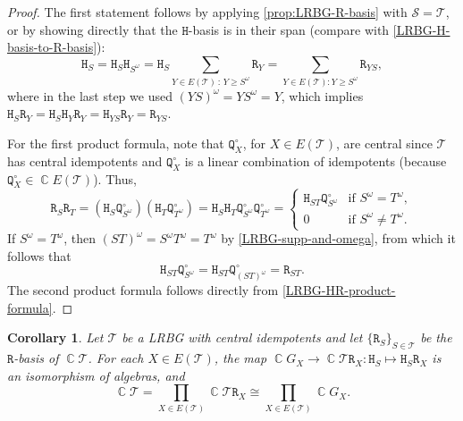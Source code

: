 \documentclass[11pt, oneside, reqno]{amsart}
\newtheorem{cor}[theorem]{Corollary}
\theoremstyle{definition}
\numberwithin{equation}{section}
\DeclareMathOperator{\C}{\mathbb{C}}
\def \SS{{\mathcal{S}}}
\def \TT{{\mathcal{T}}}
\def \kk{\C}
\newcommand{\B}[1]{\mathtt{#1}} 			%
\begin{document}
\begin{proof}
    The first statement follows by applying \cref{prop:LRBG-R-basis} with $\SS = \TT$,
    or by showing directly that the $\B{H}$-basis is in their span
    (compare with \cref{LRBG-H-basis-to-R-basis}):
    \[
        \B{H}_S =
        \B{H}_S \B{H}_{S^\omega} =
        \B{H}_S \sum_{Y \in E(\TT) \,:\, Y \geq S^\omega} \B{R}_Y =
        \sum_{Y \in E(\TT) \colon Y \geq S^\omega} \B{R}_{YS},
    \]
    where in the last step we used $(YS)^\omega = Y S^\omega = Y$, which implies
    $\B{H}_S \B{R}_Y = \B{H}_S \B{H}_Y \B{R}_Y = \B{H}_{YS} \B{R}_Y = \B{R}_{YS}$.

    For the first product formula, note that $\B{Q}^\circ_{X}$, for $X \in E(\TT)$, are
    central since $\TT$ has central idempotents and $\B{Q}^\circ_{X}$ is a linear
    combination of idempotents (because $\B{Q}^\circ_{X} \in \kk E(\TT)$). Thus,
    \[
        \B{R}_S \B{R}_T =
        (\B{H}_S \B{Q}^\circ_{S^\omega}) (\B{H}_T \B{Q}^\circ_{T^\omega}) =
        \B{H}_S \B{H}_T \B{Q}^\circ_{S^\omega} \B{Q}^\circ_{T^\omega} =
        \begin{cases}
            \B{H}_{ST} \B{Q}^\circ_{S^\omega} & \text{if } S^\omega = T^\omega,\\
            0                           & \text{if } S^\omega \neq T^\omega.
        \end{cases}
    \]
    If $S^\omega = T^\omega$, then $(ST)^\omega = S^\omega T^\omega = T^\omega$
    by \cref{LRBG-supp-and-omega}, from which it follows that
    \begin{equation*}
        \B{H}_{ST} \B{Q}^\circ_{S^\omega} = \B{H}_{ST} \B{Q}^\circ_{(ST)^\omega} = \B{R}_{ST}.
    \end{equation*}
    The second product formula follows directly from \cref{LRBG-HR-product-formula}.
\end{proof}

\begin{cor}
    \label{cor:semisimplicity-of-kT}
    Let $\TT$ be a LRBG with central idempotents
    and let $\{ \B{R}_{S} \}_{S \in \TT}$ be the $\B{R}$-basis of $\kk \TT$.
    For each $X \in E(\TT)$, the map
    $\kk G_{X} \xrightarrow{} \kk \TT \B{R}_{X}: \B{H}_{S} \mapsto \B{H}_{S} \B{R}_{X}$
    is an isomorphism of algebras, and
    \begin{equation}\label{eq:T-prod-gps}
        \kk \TT
        = \prod_{X \in E(\TT)} \kk \TT \B{R}_{X}
        \cong \prod_{X \in E(\TT)} \kk G_{X}.
    \end{equation}
\end{cor}
\end{document}
